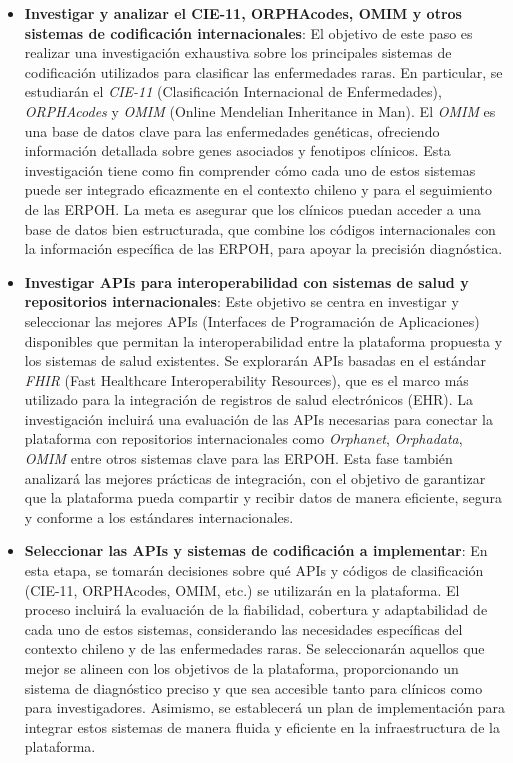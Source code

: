 \documentclass{article}
\begin{document}
\begin{itemize}[leftmargin=1.2em]

\item \textbf{Investigar y analizar el CIE-11, ORPHAcodes, OMIM y otros sistemas de codificación internacionales}:
El objetivo de este paso es realizar una investigación exhaustiva sobre los principales sistemas de codificación utilizados para clasificar las enfermedades raras. En particular, se estudiarán el \textit{CIE-11} (Clasificación Internacional de Enfermedades), \textit{ORPHAcodes} y \textit{OMIM} (Online Mendelian Inheritance in Man). El \textit{OMIM} es una base de datos clave para las enfermedades genéticas, ofreciendo información detallada sobre genes asociados y fenotipos clínicos. Esta investigación tiene como fin comprender cómo cada uno de estos sistemas puede ser integrado eficazmente en el contexto chileno y para el seguimiento de las ERPOH. La meta es asegurar que los clínicos puedan acceder a una base de datos bien estructurada, que combine los códigos internacionales con la información específica de las ERPOH, para apoyar la precisión diagnóstica. 

\item \textbf{Investigar APIs para interoperabilidad con sistemas de salud y repositorios internacionales}:
Este objetivo se centra en investigar y seleccionar las mejores APIs (Interfaces de Programación de Aplicaciones) disponibles que permitan la interoperabilidad entre la plataforma propuesta y los sistemas de salud existentes. Se explorarán APIs basadas en el estándar \textit{FHIR} (Fast Healthcare Interoperability Resources), que es el marco más utilizado para la integración de registros de salud electrónicos (EHR). La investigación incluirá una evaluación de las APIs necesarias para conectar la plataforma con repositorios internacionales como \textit{Orphanet}, \textit{Orphadata}, \textit{OMIM} entre otros sistemas clave para las ERPOH. Esta fase también analizará las mejores prácticas de integración, con el objetivo de garantizar que la plataforma pueda compartir y recibir datos de manera eficiente, segura y conforme a los estándares internacionales.

\item \textbf{Seleccionar las APIs y sistemas de codificación a implementar}:
En esta etapa, se tomarán decisiones sobre qué APIs y códigos de clasificación (CIE-11, ORPHAcodes, OMIM, etc.) se utilizarán en la plataforma. El proceso incluirá la evaluación de la fiabilidad, cobertura y adaptabilidad de cada uno de estos sistemas, considerando las necesidades específicas del contexto chileno y de las enfermedades raras. Se seleccionarán aquellos que mejor se alineen con los objetivos de la plataforma, proporcionando un sistema de diagnóstico preciso y que sea accesible tanto para clínicos como para investigadores. Asimismo, se establecerá un plan de implementación para integrar estos sistemas de manera fluida y eficiente en la infraestructura de la plataforma.


\end{itemize}
\end{document}
